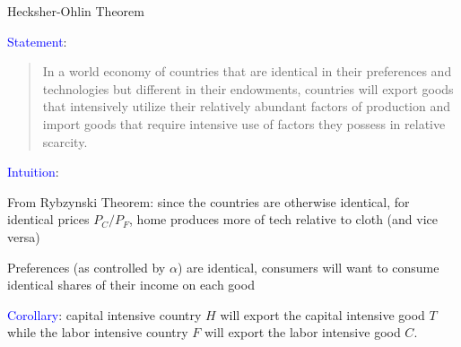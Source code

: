 \documentclass[notes,11pt, aspectratio=169, xcolor=table]{beamer}
\newcommand{\blue}[1]{\textcolor{blue}{#1}}
\newenvironment{wideitemize}{\itemize\addtolength{\itemsep}{10pt}}{\enditemize}
\begin{document}
\begin{frame}{Hecksher-Ohlin Theorem}
        \begin{wideitemize}
            \item \blue{Statement}:

            \begin{quote}
                In a world economy of countries that are identical in their preferences and technologies but different in their endowments, countries will export goods that intensively utilize their relatively abundant factors of production and import goods that require intensive use of factors they possess in relative scarcity.  
            \end{quote}
            \item<2-> \blue{Intuition}:

            \begin{wideitemize}
                \item From Rybzynski Theorem: since the countries are otherwise identical, for identical prices $P_C/P_F$, home produces more of tech relative to cloth (and vice versa)

                \item Preferences (as controlled by $\alpha$) are identical, consumers will want to consume identical shares of their income on each good

                \item \blue{Corollary}: capital intensive country $H$ will export the capital intensive good $T$ while the labor intensive country $F$ will export the labor intensive good $C$.
            \end{wideitemize}
        \end{wideitemize}
\end{frame}
\end{document}
